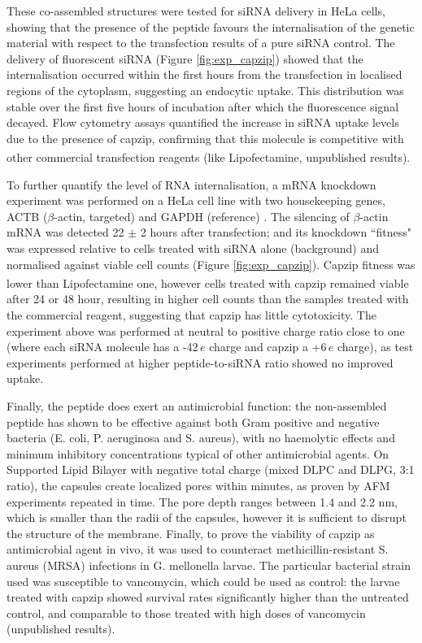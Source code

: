 These co-assembled structures were tested for siRNA delivery in HeLa cells, showing that the presence of the peptide favours the internalisation of the genetic material with respect to the transfection results of a pure siRNA control. The delivery of fluorescent siRNA (Figure \ref{fig:exp_capzip}) showed that the internalisation occurred within the first hours from the transfection in localised regions of the cytoplasm, suggesting an endocytic uptake. This distribution was stable over the first five hours of incubation after which the fluorescence signal decayed.
%
Flow cytometry assays quantified the increase in siRNA uptake levels due to the presence of capzip, confirming that this molecule is competitive with other commercial transfection reagents (like Lipofectamine\textsuperscript{\textregistered}, unpublished results).

To further quantify the level of RNA internalisation, a mRNA knockdown experiment was performed on a HeLa cell line with two housekeeping genes, ACTB ($\beta$-actin, targeted) and GAPDH (reference) \cite{Crombez2009}.
%
The silencing of $\beta$-actin mRNA was detected 22 $\pm$ 2 hours after transfection; and its knockdown ``fitness" was expressed relative to cells treated with siRNA alone (background) and normalised against viable cell counts (Figure \ref{fig:exp_capzip}). Capzip fitness was lower than Lipofectamine\textsuperscript{\textregistered} one, however cells treated with capzip remained viable after 24 or 48 hour, resulting in higher cell counts than the samples treated with the commercial reagent, suggesting that capzip has little cytotoxicity.
%
The experiment above was performed at neutral to positive charge ratio close to one (where each siRNA molecule has a -42$\, e$ charge and capzip a +6$\, e$ charge), as test experiments performed at higher peptide-to-siRNA ratio showed no improved uptake.

Finally, the peptide does exert an antimicrobial function: the non-assembled peptide has shown to be effective against both Gram positive and negative bacteria (E. coli, P. aeruginosa and S. aureus), with no haemolytic effects and minimum inhibitory concentrations typical of other antimicrobial agents.
%
On Supported Lipid Bilayer with negative total charge (mixed DLPC and DLPG, 3:1 ratio), the capsules create localized pores within minutes, as proven by AFM experiments repeated in time. The pore depth ranges between 1.4 and 2.2 nm, which is smaller than the radii of the capsules, however it is sufficient to disrupt the structure of the membrane.
%
Finally, to prove the viability of capzip as antimicrobial agent in vivo, it was used to counteract methicillin-resistant S. aureus (MRSA) infections in G. mellonella larvae. The particular bacterial strain used was susceptible to vancomycin, which could be used as control: the larvae treated with capzip showed survival rates significantly higher than the untreated control, and comparable to those treated with high doses of vancomycin (unpublished results).

